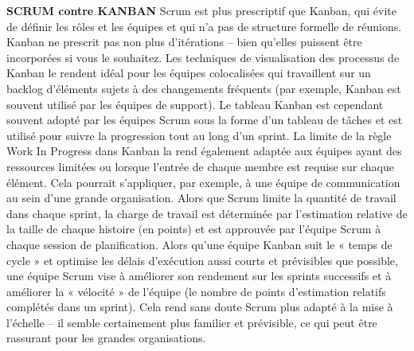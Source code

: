 \textbf{SCRUM contre KANBAN}
\newline
Scrum est plus prescriptif que Kanban, qui évite de définir les rôles et les équipes et qui n’a pas de structure formelle de réunions. Kanban ne prescrit pas non plus d’itérations – bien qu’elles puissent être incorporées si vous le souhaitez. \newline
Les techniques de visualisation des processus de Kanban le rendent idéal pour les équipes colocalisées qui travaillent sur un backlog d’éléments sujets à des changements fréquents (par exemple, Kanban est souvent utilisé par les équipes de support). \newline
Le tableau Kanban est cependant souvent adopté par les équipes Scrum sous la forme d’un tableau de tâches et est utilisé pour suivre la progression tout au long d’un sprint. \newline
La limite de la règle Work In Progress dans Kanban la rend également adaptée aux équipes ayant des ressources limitées ou lorsque l’entrée de chaque membre est requise sur chaque élément. Cela pourrait s’appliquer, par exemple, à une équipe de communication au sein d’une grande organisation. \newline
Alors que Scrum limite la quantité de travail dans chaque sprint, la charge de travail est déterminée par l’estimation relative de la taille de chaque histoire (en points) et est approuvée par l’équipe Scrum à chaque session de planification. \newline
Alors qu’une équipe Kanban suit le « temps de cycle » et optimise les délais d’exécution aussi courts et prévisibles que possible, une équipe Scrum vise à améliorer son rendement sur les sprints successifs et à améliorer la « vélocité » de l’équipe (le nombre de points d’estimation relatifs complétés dans un sprint). Cela rend sans doute Scrum plus adapté à la mise à l’échelle – il semble certainement plus familier et prévisible, ce qui peut être rassurant pour les grandes organisations. \newline\newline

